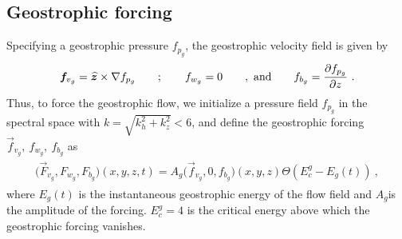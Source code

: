 \documentclass[../Rajarshi-thesis-draft.tex]{subfiles}
\begin{document}
\subsection{Geostrophic forcing}
Specifying a geostrophic pressure $f_{p_g}$, the geostrophic velocity field is given by 
\begin{align}
\begin{split}
	\boldsymbol{f}_{v_g} = \boldsymbol{\widehat{z}} \times \nabla f_{p_g}\qquad; \qquad f_{w_g} = 0 \qquad,\mbox{ and}\qquad f_{b_g} = \frac{\partial f_{p_g}}{\partial z} \ .
\end{split}
\end{align}
Thus, to force the geostrophic flow, we initialize a pressure field $f_{p_g}$ in the spectral space with $k = \sqrt{k_h^2 + k_z^2}< 6$, and define the geostrophic forcing $\vec{f}_{v_g}, \ f_{w_g}, \  f_{b_g}$ as 
\begin{align}
\begin{split}
	\Big(\vec{F}_{v_g},F_{w_g}, F_{b_g}\Big)(x,y,z,t) = A_g\Big(\vec{f}_{v_g},0,f_{b_g}\Big)(x,y,z)\Theta\left(E_c^g - E_g(t)\right) \ ,
\end{split}
\end{align}
where $E_g(t)$ is the instantaneous geostrophic energy of the flow field and $A_g$is the amplitude of the forcing. $E_c^g =4$ is the critical energy above which the geostrophic forcing vanishes. 
\end{document}
